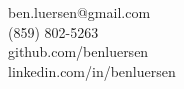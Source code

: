 \documentclass[margin,line]{resume}
\begin{document}
{
    \hfill ben.luersen@gmail.com       \vspace{0mm}\\\vspace{0mm}%
    \hfill (859) 802-5263 \vspace{0mm}\\\vspace{0mm}%
    \hfill github.com/benluersen \vspace{0mm}\\\vspace{0mm}
    \hfill linkedin.com/in/benluersen           \vspace{-9mm}\\\vspace{0mm}%
    
}
\end{document}
